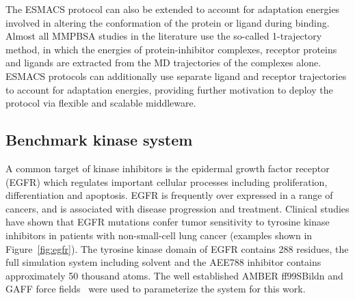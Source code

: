 The ESMACS protocol can also be extended to account for adaptation energies
involved in altering the conformation of the protein or ligand during
binding. Almost all MMPBSA studies in the literature use the so-called
1-trajectory method, in which the energies of protein-inhibitor complexes,
receptor proteins and ligands are extracted from the MD trajectories of the
complexes alone. ESMACS protocols can additionally use separate ligand and
receptor trajectories to account for adaptation energies, providing further
motivation to deploy the protocol via flexible and scalable middleware.

\subsection{Benchmark kinase system}

A common target of kinase inhibitors is the epidermal growth factor receptor
(EGFR) which regulates important cellular processes including proliferation,
differentiation and apoptosis. EGFR is frequently over expressed in a range
of cancers, and is associated with disease progression and treatment.
Clinical studies have shown that EGFR mutations confer tumor sensitivity to
tyrosine kinase inhibitors in patients with non-small-cell lung cancer
(examples shown in Figure~\ref{fig:egfr}).
The tyrosine kinase domain of EGFR contains 288 residues, the full simulation
system including solvent and the AEE788 inhibitor contains approximately 50
thousand atoms. The well established AMBER ff99SBildn and GAFF force
fields~\cite{Maier2015, Wang2004} were used to parameterize the system for
this work.

